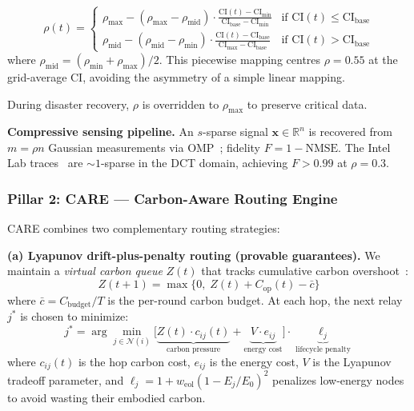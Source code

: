 \documentclass[12pt, onecolumn, journal]{IEEEtran}
\begin{document}
\begin{equation}
    \rho(t) = \begin{cases}
        \rho_{\max} - (\rho_{\max} - \rho_{\text{mid}}) \cdot \frac{\text{CI}(t) - \text{CI}_{\min}}{\text{CI}_{\text{base}} - \text{CI}_{\min}} & \text{if } \text{CI}(t) \leq \text{CI}_{\text{base}} \\[6pt]
        \rho_{\text{mid}} - (\rho_{\text{mid}} - \rho_{\min}) \cdot \frac{\text{CI}(t) - \text{CI}_{\text{base}}}{\text{CI}_{\max} - \text{CI}_{\text{base}}} & \text{if } \text{CI}(t) > \text{CI}_{\text{base}}
    \end{cases}
    \label{eq:rho}
\end{equation}
where $\rho_{\text{mid}} = (\rho_{\min} + \rho_{\max}) / 2$.
This piecewise mapping centres $\rho = 0.55$ at the grid-average CI, avoiding the asymmetry of a simple linear mapping.

During disaster recovery, $\rho$ is overridden to $\rho_{\max}$ to preserve critical data.

\textbf{Compressive sensing pipeline.}
An $s$-sparse signal $\mathbf{x} \in \mathbb{R}^n$ is recovered from $m{=}\rho n$ Gaussian measurements via OMP~\cite{candes2006cs, tropp2007omp}; fidelity $F = 1 - \text{NMSE}$.
The Intel Lab traces~\cite{intel_lab_data} are ${\sim}1$-sparse in the DCT domain, achieving $F > 0.99$ at $\rho = 0.3$.

\subsubsection{Pillar 2: CARE --- Carbon-Aware Routing Engine}
\label{sec:care}

CARE combines two complementary routing strategies:

\textbf{(a) Lyapunov drift-plus-penalty routing (provable guarantees).}
We maintain a \emph{virtual carbon queue} $Z(t)$ that tracks cumulative carbon overshoot~\cite{neely2010lyapunov}:
\begin{equation}
    Z(t+1) = \max\big\{0, \; Z(t) + C_{\text{op}}(t) - \bar{c}\big\}
    \label{eq:queue_update}
\end{equation}
where $\bar{c} = C_{\text{budget}} / T$ is the per-round carbon budget.
At each hop, the next relay $j^*$ is chosen to minimize:
\begin{equation}
    j^* = \arg\min_{j \in \mathcal{N}(i)} \Big[\underbrace{Z(t) \cdot c_{ij}(t)}_{\text{carbon pressure}} + \underbrace{V \cdot e_{ij}}_{\text{energy cost}}\Big] \cdot \underbrace{\ell_j}_{\text{lifecycle penalty}}
    \label{eq:lyapunov_decision}
\end{equation}
where $c_{ij}(t)$ is the hop carbon cost, $e_{ij}$ is the energy cost, $V$ is the Lyapunov tradeoff parameter, and $\ell_j = 1 + w_{\text{eol}}(1 - E_j/E_0)^2$ penalizes low-energy nodes to avoid wasting their embodied carbon.
\end{document}
